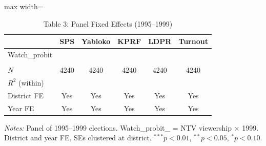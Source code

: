 \begin{table}[htbp]
\centering
\caption{Table 3: Panel Fixed Effects (1995--1999)}
\label{tab:enik_table3}
\begin{adjustbox}{max width=\textwidth}
\begin{tabular}{lccccc}
\toprule
 & SPS & Yabloko & KPRF & LDPR & Turnout \\
\midrule
Watch\_probit &  &  &  &  &  \\
 &  &  &  &  &  \\
$N$ & 4240 & 4240 & 4240 & 4240 & 4240 \\
$R^2$ (within) &  &  &  &  &  \\
\midrule
District FE & Yes & Yes & Yes & Yes & Yes \\
Year FE & Yes & Yes & Yes & Yes & Yes \\
\bottomrule
\end{tabular}
\end{adjustbox}
\parbox{\textwidth}{\footnotesize\textit{Notes:} Panel of 1995--1999 elections. Watch\_probit\_ = NTV viewership $\times$ 1999. District and year FE. SEs clustered at district. $^{***}p<0.01$, $^{**}p<0.05$, $^{*}p<0.10$.}
\end{table}